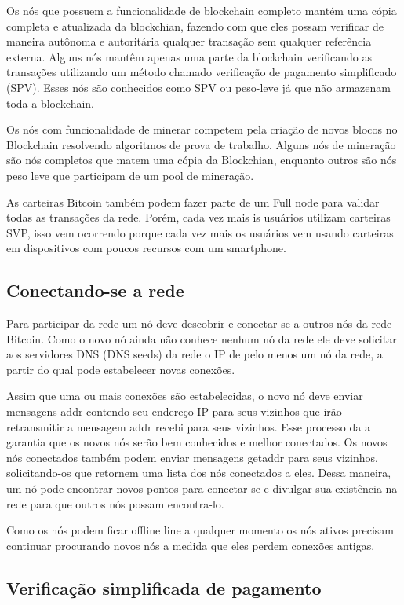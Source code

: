 \documentclass[conference,compsoc]{IEEEtran}
\begin{document}
Os nós que possuem a funcionalidade de blockchain completo mantém uma cópia completa e atualizada  da blockchian, fazendo com que eles possam verificar de maneira autônoma e autoritária qualquer transação sem qualquer referência externa. Alguns nós mantêm apenas uma parte da blockchain verificando as transações utilizando um método chamado verificação de pagamento simplificado (SPV). Esses nós são conhecidos como SPV ou peso-leve já que não armazenam toda a blockchain.

Os nós com funcionalidade de minerar competem pela criação de novos blocos no Blockchain resolvendo algoritmos de prova de trabalho. Alguns nós de mineração são nós completos que matem uma cópia da Blockchian, enquanto outros são nós peso leve que participam de um pool de mineração. 

As carteiras Bitcoin também podem fazer parte de um Full node para validar todas as transações da rede. Porém, cada vez mais is usuários utilizam carteiras SVP, isso vem ocorrendo porque cada vez mais os usuários vem usando carteiras em dispositivos com poucos recursos com um smartphone. 

\subsection*{Conectando-se a rede}

Para participar da rede um nó deve descobrir e conectar-se a outros nós da rede Bitcoin. Como o novo nó ainda não conhece nenhum nó da rede ele deve solicitar aos servidores DNS (DNS seeds) da rede o IP de pelo menos um nó da rede, a partir do qual pode estabelecer novas conexões.

Assim que uma ou mais conexões são estabelecidas, o novo nó deve enviar mensagens addr contendo seu endereço IP para seus vizinhos que irão retransmitir a mensagem addr recebi para seus vizinhos. Esse processo da a garantia que os novos nós serão bem conhecidos e melhor conectados. Os novos nós conectados também podem enviar mensagens getaddr para seus vizinhos, solicitando-os que retornem uma lista dos nós conectados a eles. Dessa maneira, um nó pode encontrar novos pontos para conectar-se e divulgar sua existência na rede para que outros nós possam encontra-lo.  

Como os nós podem ficar offline line a qualquer momento os nós ativos precisam continuar procurando novos nós a medida que eles perdem conexões antigas.

\subsection*{Verificação simplificada de pagamento}
\end{document}
